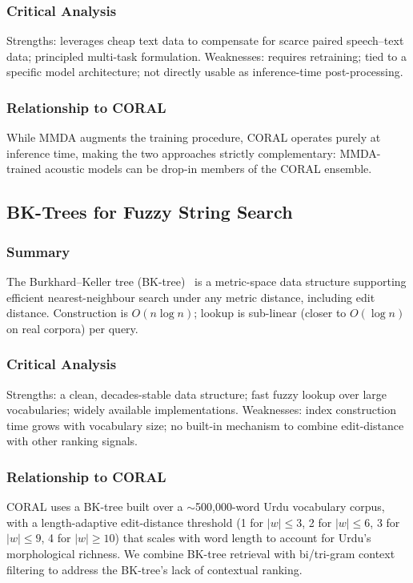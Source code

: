 \subsubsection{Critical Analysis}
Strengths: leverages cheap text data to compensate for scarce paired speech--text data; principled multi-task formulation. Weaknesses: requires retraining; tied to a specific model architecture; not directly usable as inference-time post-processing.

\subsubsection{Relationship to CORAL}
While MMDA augments the training procedure, CORAL operates purely at inference time, making the two approaches strictly complementary: MMDA-trained acoustic models can be drop-in members of the CORAL ensemble.

\subsection{BK-Trees for Fuzzy String Search}
\label{ssec:lit-bk}

\subsubsection{Summary}
The Burkhard--Keller tree (BK-tree)~\cite{burkhard1973bk} is a metric-space data structure supporting efficient nearest-neighbour search under any metric distance, including edit distance. Construction is $O(n \log n)$; lookup is sub-linear (closer to $O(\log n)$ on real corpora) per query.

\subsubsection{Critical Analysis}
Strengths: a clean, decades-stable data structure; fast fuzzy lookup over large vocabularies; widely available implementations. Weaknesses: index construction time grows with vocabulary size; no built-in mechanism to combine edit-distance with other ranking signals.

\subsubsection{Relationship to CORAL}
CORAL uses a BK-tree built over a $\sim$500{,}000-word Urdu vocabulary corpus, with a length-adaptive edit-distance threshold (1 for $|w|\le3$, 2 for $|w|\le6$, 3 for $|w|\le9$, 4 for $|w|\ge10$) that scales with word length to account for Urdu's morphological richness. We combine BK-tree retrieval with bi/tri-gram context filtering to address the BK-tree's lack of contextual ranking.

